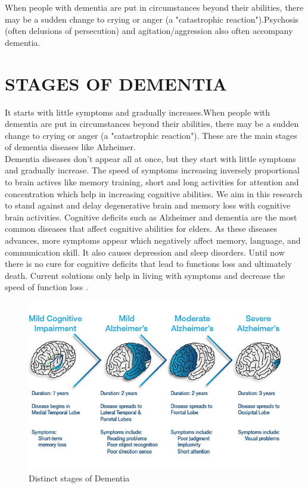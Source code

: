 When people with dementia are put in circumstances beyond their abilities, there may be a sudden change to crying or anger (a "catastrophic reaction").Psychosis (often delusions of persecution) and agitation/aggression also often accompany dementia.



\section{ STAGES OF DEMENTIA}

It starts with little symptoms and gradually increases.When people with dementia are put in circumstances beyond their abilities, there may be a sudden change to crying or anger (a "catastrophic reaction"). These are the main stages of dementia diseases like Alzheimer.
\\ Dementia diseases don’t appear all at once, but they start with little symptoms and gradually increase. The speed of symptoms increasing inversely proportional to brain actives like memory training, short and long activities for attention and concentration which help in increasing cognitive abilities. We aim in this research to stand against and delay degenerative brain and memory loss with cognitive brain activities. Cognitive deficits such as Alzheimer and dementia are the most common diseases that affect cognitive abilities for elders. As these diseases advances, more symptoms appear which negatively affect memory, language, and communication
skill. It also causes depression and sleep disorders. Until now there is no cure for cognitive deficits that lead to functions loss and ultimately death. Current solutions only help in living with symptoms and decrease the speed of function loss . 

\begin{figure}[h]
\begin{center}
\includegraphics[width = 13 cm]{5.PNG}
\caption{Distinct stages of Dementia}
\end{center}
\end{figure}


